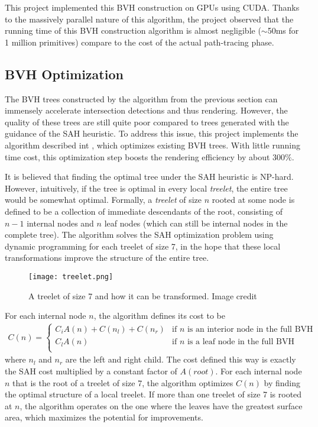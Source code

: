 
This project implemented this BVH construction on GPUs using CUDA. Thanks to the massively parallel nature of this algorithm, the project observed that the running time of this BVH construction algorithm is almost negligible ($\sim$50ms for 1 million primitives) compare to the cost of the actual path-tracing phase.


\subsection{BVH Optimization}
The BVH trees constructed by the algorithm from the previous section can immensely accelerate intersection detections and thus rendering. However, the quality of these trees are still quite poor compared to trees generated with the guidance of the SAH heuristic. To address this issue, this project implements the algorithm described int \cite{bvh_optimize}, which optimizes existing BVH trees. With little running time cost, this optimization step boosts the rendering efficiency by about $300\%$.

It is believed that finding the optimal tree under the SAH heuristic is NP-hard\cite{bvh_optimize}. However, intuitively, if the tree is optimal in every local \textit{treelet}, the entire tree would be somewhat optimal. Formally, a \textit{treelet} of size $n$ rooted at some node is defined to be a collection of immediate descendants of the root, consisting of $n-1$ internal nodes and $n$ leaf nodes (which can still be internal nodes in the complete tree). The algorithm solves the SAH optimization problem using dynamic programming for each treelet of size 7, in the hope that these local transformations improve the structure of the entire tree. 

\begin{figure}[H]
    \centering
    \texttt{[image: treelet.png]}
    \caption{A treelet of size 7 and how it can be transformed. Image credit \cite{bvh_optimize}}
\end{figure}
For each internal node $n$, the algorithm defines its cost to be 
\begin{align*}
    C(n) = 
    \begin{cases}
        C_i A(n) + C(n_l) + C(n_r) &\text{if $n$ is an interior node in the full BVH}\\
        C_l A(n) &\text{if $n$ is a leaf node in the full BVH}\\
    \end{cases}
\end{align*}
where $n_l$ and $n_r$ are the left and right child. The cost defined this way is exactly the SAH cost multiplied by a constant factor of $A(root)$. For each internal node $n$ that is the root of a treelet of size 7, the algorithm optimizes $C(n)$ by finding the optimal structure of a local treelet. If more than one treelet of size 7 is rooted at $n$, the algorithm operates on the one where the leaves have the greatest surface area, which maximizes the potential for improvements. 

